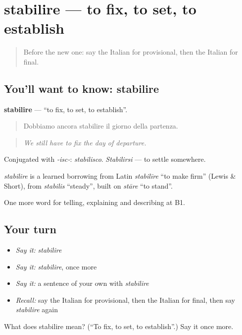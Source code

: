 \section[stabilire]{stabilire — to fix, to set, to establish}

\label{lesson:IT-C375-stabilire}



\begin{quote}
Before the new one: say the Italian for provisional, then the Italian for final.
\end{quote}

\subsection*{You'll want to know: stabilire}
\textbf{stabilire} — \textquotedblleft{}to fix, to set, to establish\textquotedblright{}.

\begin{quote}
Dobbiamo ancora stabilire il giorno della partenza.
\end{quote}

\begin{quote}
\emph{We still have to fix the day of departure.}
\end{quote}

Conjugated with \emph{-isc-}: \emph{stabilisco}. \emph{Stabilirsi} — to settle somewhere.

\begin{cousinweb}
\emph{stabilire} is a learned borrowing from Latin \emph{stabilīre} \textquotedblleft{}to make firm\textquotedblright{} (Lewis \& Short), from \emph{stabilis} \textquotedblleft{}steady\textquotedblright{}, built on \emph{stāre} \textquotedblleft{}to stand\textquotedblright{}.
\end{cousinweb}

\begin{grammarlens}[title={What you've built}]
One more word for telling, explaining and describing at B1.
\end{grammarlens}

\subsection*{Your turn}
\begin{itemize}
\raggedright
  \item \emph{Say it:} \emph{stabilire}
  \item \emph{Say it:} \emph{stabilire}, once more
  \item \emph{Say it:} a sentence of your own with \emph{stabilire}
  \item \emph{Recall:} say the Italian for provisional, then the Italian for final, then say \emph{stabilire} again
\end{itemize}

\begin{tcolorbox}[breakable,colback=teal!4,colframe=teal!35!black,title={Before you move on}]
What does stabilire mean? (\textquotedblleft{}To fix, to set, to establish\textquotedblright{}.) Say it once more.
\end{tcolorbox}
